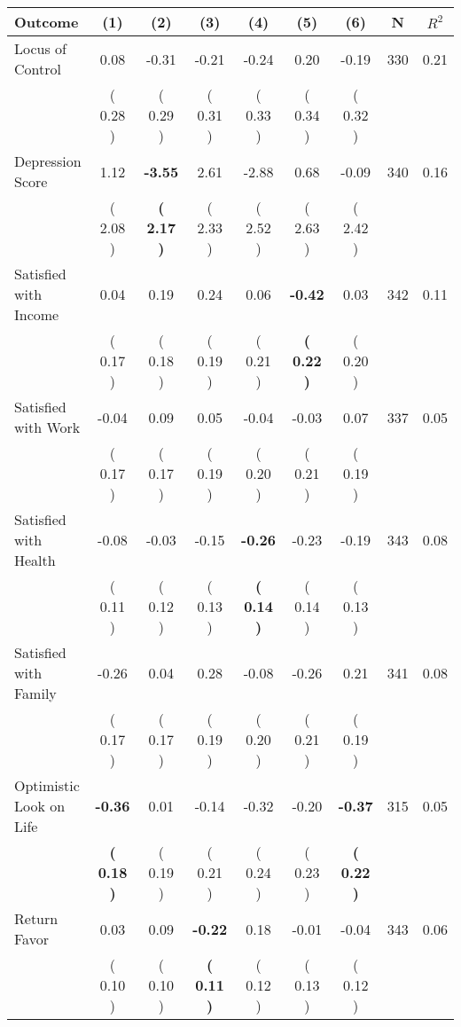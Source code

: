 \begin{tabular}{lcccccccc}
\toprule
 \textbf{Outcome} & \textbf{(1)} & \textbf{(2)} & \textbf{(3)} & \textbf{(4)} & \textbf{(5)} & \textbf{(6)} & \textbf{N} & \textbf{$ R^2$} \\
\midrule
Locus of Control &      0.08 &     -0.31 &     -0.21 &     -0.24 &      0.20 &     -0.19 & 330 &       0.21 \\ 
 & (     0.28 ) & (     0.29 ) & (     0.31 ) & (     0.33 ) & (     0.34 ) & (     0.32 ) & \\
Depression Score &      1.12 & \textbf{    -3.55} &      2.61 &     -2.88 &      0.68 &     -0.09 & 340 &       0.16 \\ 
 & (     2.08 ) & \textbf{(     2.17 )} & (     2.33 ) & (     2.52 ) & (     2.63 ) & (     2.42 ) & \\
Satisfied with Income &      0.04 &      0.19 &      0.24 &      0.06 & \textbf{    -0.42} &      0.03 & 342 &       0.11 \\ 
 & (     0.17 ) & (     0.18 ) & (     0.19 ) & (     0.21 ) & \textbf{(     0.22 )} & (     0.20 ) & \\
Satisfied with Work &     -0.04 &      0.09 &      0.05 &     -0.04 &     -0.03 &      0.07 & 337 &       0.05 \\ 
 & (     0.17 ) & (     0.17 ) & (     0.19 ) & (     0.20 ) & (     0.21 ) & (     0.19 ) & \\
Satisfied with Health &     -0.08 &     -0.03 &     -0.15 & \textbf{    -0.26} &     -0.23 &     -0.19 & 343 &       0.08 \\ 
 & (     0.11 ) & (     0.12 ) & (     0.13 ) & \textbf{(     0.14 )} & (     0.14 ) & (     0.13 ) & \\
Satisfied with Family &     -0.26 &      0.04 &      0.28 &     -0.08 &     -0.26 &      0.21 & 341 &       0.08 \\ 
 & (     0.17 ) & (     0.17 ) & (     0.19 ) & (     0.20 ) & (     0.21 ) & (     0.19 ) & \\
Optimistic Look on Life & \textbf{    -0.36} &      0.01 &     -0.14 &     -0.32 &     -0.20 & \textbf{    -0.37} & 315 &       0.05 \\ 
 & \textbf{(     0.18 )} & (     0.19 ) & (     0.21 ) & (     0.24 ) & (     0.23 ) & \textbf{(     0.22 )} & \\
Return Favor &      0.03 &      0.09 & \textbf{    -0.22} &      0.18 &     -0.01 &     -0.04 & 343 &       0.06 \\ 
 & (     0.10 ) & (     0.10 ) & \textbf{(     0.11 )} & (     0.12 ) & (     0.13 ) & (     0.12 ) & \\

\end{tabular}
